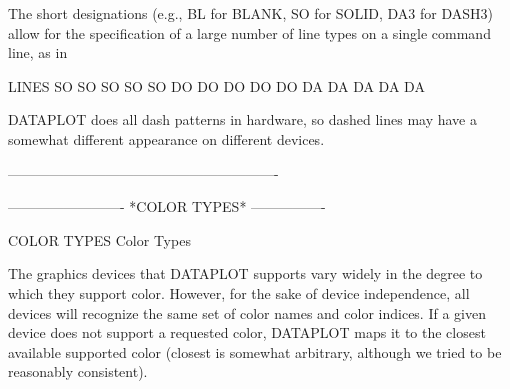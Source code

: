 The short designations (e.g., BL for BLANK, SO for SOLID, DA3 for
DASH3) allow for the specification of a large number of line types on a
single command line, as in
 
   LINES SO SO SO SO SO DO DO DO DO DO DA DA DA DA DA
 
DATAPLOT does all dash patterns in hardware, so dashed lines may have a
somewhat different appearance on different devices.
 
----------------------------------------------------------
 
 
 
 
 
 
 
 
 
 
 
 
 
 
 
 
 
 
 
 
 
 
 
 
 
 
 
 
 
 
 
 
 
 
 
 
 
 
 
 
 
 
 
 
 
 
 
 
 
 
 
 
 
 
 
 
 
 
 
 
 
 
 
 
 
 
 
 
 
 
 
 


-------------------------  *COLOR TYPES*  ----------------
 
COLOR TYPES
Color Types
 
The graphics devices that DATAPLOT supports vary widely in the degree
to which they support color.  However, for the sake of device
independence, all devices will recognize the same set of color names
and color indices.  If a given device does not support a requested
color, DATAPLOT maps it to the closest available supported color
(closest is somewhat arbitrary, although we tried to be reasonably
consistent).
 
